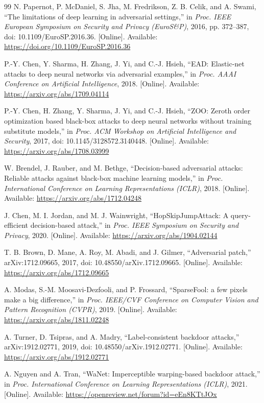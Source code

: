 \documentclass[conference]{IEEEtran}
\begin{document}
\begin{thebibliography}{99}
N. Papernot, P. McDaniel, S. Jha, M. Fredrikson, Z. B. Celik, and A. Swami, ``The limitations of deep learning in adversarial settings,'' in \emph{Proc. IEEE European Symposium on Security and Privacy (EuroS\&P)}, 2016, pp. 372--387, doi: 10.1109/EuroSP.2016.36. [Online]. Available: \url{https://doi.org/10.1109/EuroSP.2016.36}

P.-Y. Chen, Y. Sharma, H. Zhang, J. Yi, and C.-J. Hsieh, ``EAD: Elastic-net attacks to deep neural networks via adversarial examples,'' in \emph{Proc. AAAI Conference on Artificial Intelligence}, 2018. [Online]. Available: \url{https://arxiv.org/abs/1709.04114}

P.-Y. Chen, H. Zhang, Y. Sharma, J. Yi, and C.-J. Hsieh, ``ZOO: Zeroth order optimization based black-box attacks to deep neural networks without training substitute models,'' in \emph{Proc. ACM Workshop on Artificial Intelligence and Security}, 2017, doi: 10.1145/3128572.3140448. [Online]. Available: \url{https://arxiv.org/abs/1708.03999}

W. Brendel, J. Rauber, and M. Bethge, ``Decision-based adversarial attacks: Reliable attacks against black-box machine learning models,'' in \emph{Proc. International Conference on Learning Representations (ICLR)}, 2018. [Online]. Available: \url{https://arxiv.org/abs/1712.04248}

J. Chen, M. I. Jordan, and M. J. Wainwright, ``HopSkipJumpAttack: A query-efficient decision-based attack,'' in \emph{Proc. IEEE Symposium on Security and Privacy}, 2020. [Online]. Available: \url{https://arxiv.org/abs/1904.02144}

T. B. Brown, D. Mane, A. Roy, M. Abadi, and J. Gilmer, ``Adversarial patch,'' arXiv:1712.09665, 2017, doi: 10.48550/arXiv.1712.09665. [Online]. Available: \url{https://arxiv.org/abs/1712.09665}

A. Modas, S.-M. Moosavi-Dezfooli, and P. Frossard, ``SparseFool: a few pixels make a big difference,'' in \emph{Proc. IEEE/CVF Conference on Computer Vision and Pattern Recognition (CVPR)}, 2019. [Online]. Available: \url{https://arxiv.org/abs/1811.02248}

A. Turner, D. Tsipras, and A. Madry, ``Label-consistent backdoor attacks,'' arXiv:1912.02771, 2019, doi: 10.48550/arXiv.1912.02771. [Online]. Available: \url{https://arxiv.org/abs/1912.02771}

A. Nguyen and A. Tran, ``WaNet: Imperceptible warping-based backdoor attack,'' in \emph{Proc. International Conference on Learning Representations (ICLR)}, 2021. [Online]. Available: \url{https://openreview.net/forum?id=eEn8KTtJOx}


\end{thebibliography}
\end{document}
